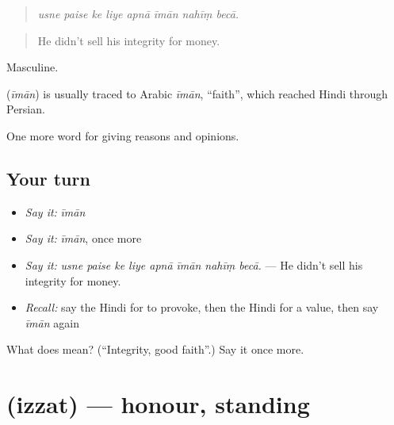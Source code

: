 \begin{quote}
       
\end{quote}

\begin{quote}
\emph{usne paise ke liye apnā īmān nahīṃ becā.}
\end{quote}

\begin{quote}
He didn't sell his integrity for money.
\end{quote}

Masculine.

\begin{cousinweb}
\textbf{} (\emph{īmān}) is usually traced to Arabic \emph{īmān}, \textquotedblleft{}faith\textquotedblright{}, which reached Hindi through Persian.
\end{cousinweb}

\begin{grammarlens}[title={What you've built}]
One more word for giving reasons and opinions.
\end{grammarlens}

\subsection*{Your turn}
\begin{itemize}
\raggedright
  \item \emph{Say it:} \emph{īmān}
  \item \emph{Say it:} \emph{īmān}, once more
  \item \emph{Say it:} \emph{usne paise ke liye apnā īmān nahīṃ becā.} — He didn't sell his integrity for money.
  \item \emph{Recall:} say the Hindi for to provoke, then the Hindi for a value, then say \emph{īmān} again
\end{itemize}

\begin{tcolorbox}[breakable,colback=teal!4,colframe=teal!35!black,title={Before you move on}]
What does  mean? (\textquotedblleft{}Integrity, good faith\textquotedblright{}.) Say it once more.
\end{tcolorbox}
\section[\texorpdfstring{\hi{इज़्ज़त} (izzat)}{इज़्ज़त (izzat)}]{ (izzat) — honour, standing}

